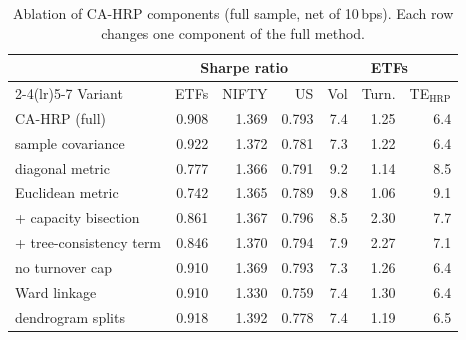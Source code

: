 \begin{table}[!htbp]\centering\small
\caption{Ablation of CA-HRP components (full sample, net of 10\,bps). Each row changes one component of the full method.}\label{tab:ablation}
\begin{tabular}{l rrr rrr}\toprule
 & \multicolumn{3}{c}{Sharpe ratio} & \multicolumn{3}{c}{ETFs}\\
\cmidrule(lr){2-4}\cmidrule(lr){5-7}
Variant & ETFs & NIFTY & US & Vol & Turn. & TE$_{\text{HRP}}$\\\midrule
CA-HRP (full) & 0.908 & 1.369 & 0.793 & 7.4 & 1.25 & 6.4\\
\midrule
sample covariance & 0.922 & 1.372 & 0.781 & 7.3 & 1.22 & 6.4\\
diagonal metric & 0.777 & 1.366 & 0.791 & 9.2 & 1.14 & 8.5\\
Euclidean metric & 0.742 & 1.365 & 0.789 & 9.8 & 1.06 & 9.1\\
+ capacity bisection & 0.861 & 1.367 & 0.796 & 8.5 & 2.30 & 7.7\\
+ tree-consistency term & 0.846 & 1.370 & 0.794 & 7.9 & 2.27 & 7.1\\
no turnover cap & 0.910 & 1.369 & 0.793 & 7.3 & 1.26 & 6.4\\
Ward linkage & 0.910 & 1.330 & 0.759 & 7.4 & 1.30 & 6.4\\
dendrogram splits & 0.918 & 1.392 & 0.778 & 7.4 & 1.19 & 6.5\\
\bottomrule\end{tabular}\end{table}